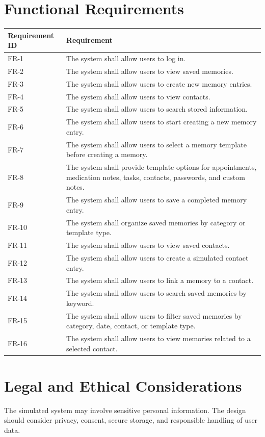 \documentclass{article}
\begin{document}
\section{Functional Requirements}
\begin{longtable}{|p{3cm}|p{10cm}|}
\hline
Requirement ID & Requirement \\ \hline
FR-1 & The system shall allow users to log in. \\ \hline
FR-2 & The system shall allow users to view saved memories. \\ \hline
FR-3 & The system shall allow users to create new memory entries. \\ \hline
FR-4 & The system shall allow users to view contacts. \\ \hline
FR-5 & The system shall allow users to search stored information. \\ \hline
FR-6 & The system shall allow users to start creating a new memory entry. \\ \hline
FR-7 & The system shall allow users to select a memory template before creating a memory. \\ \hline
FR-8 & The system shall provide template options for appointments, medication notes, tasks, contacts, passwords, and custom notes. \\ \hline
FR-9 & The system shall allow users to save a completed memory entry. \\ \hline
FR-10 & The system shall organize saved memories by category or template type. \\ \hline
FR-11 & The system shall allow users to view saved contacts. \\ \hline
FR-12 & The system shall allow users to create a simulated contact entry. \\ \hline
FR-13 & The system shall allow users to link a memory to a contact. \\ \hline
FR-14 & The system shall allow users to search saved memories by keyword. \\ \hline
FR-15 & The system shall allow users to filter saved memories by category, date, contact, or template type. \\ \hline
FR-16 & The system shall allow users to view memories related to a selected contact. \\ \hline
\end{longtable}

\section{Legal and Ethical Considerations}
The simulated system may involve sensitive personal information. The design should consider privacy, consent, secure storage, and responsible handling of user data.
\end{document}
